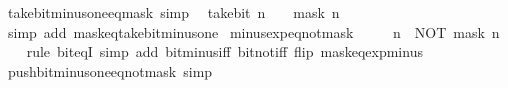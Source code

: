 \begin{isabellebody}
\endisatagproof
{\isafoldproof}%
%
\isadelimproof
\isanewline
%
\endisadelimproof
\isanewline
{}\isamarkupfalse%
\ take{\isacharunderscore}{\kern0pt}bit{\isacharunderscore}{\kern0pt}minus{\isacharunderscore}{\kern0pt}one{\isacharunderscore}{\kern0pt}eq{\isacharunderscore}{\kern0pt}mask\ {\isacharbrackleft}{\kern0pt}simp{\isacharbrackright}{\kern0pt}{\isacharcolon}{\kern0pt}\isanewline
\ \ {\isacartoucheopen}take{\isacharunderscore}{\kern0pt}bit\ n\ {\isacharparenleft}{\kern0pt}{\isacharminus}{\kern0pt}\ {}{\isacharparenright}{\kern0pt}\ {\isacharequal}{\kern0pt}\ mask\ n{\isacartoucheclose}\isanewline
%
\isadelimproof
\ \ %
\endisadelimproof
%
\isatagproof
{}\isamarkupfalse%
\ {\isacharparenleft}{\kern0pt}simp\ add{\isacharcolon}{\kern0pt}\ mask{\isacharunderscore}{\kern0pt}eq{\isacharunderscore}{\kern0pt}take{\isacharunderscore}{\kern0pt}bit{\isacharunderscore}{\kern0pt}minus{\isacharunderscore}{\kern0pt}one{\isacharparenright}{\kern0pt}%
\endisatagproof
{\isafoldproof}%
%
\isadelimproof
\isanewline
%
\endisadelimproof
\isanewline
{}\isamarkupfalse%
\ minus{\isacharunderscore}{\kern0pt}exp{\isacharunderscore}{\kern0pt}eq{\isacharunderscore}{\kern0pt}not{\isacharunderscore}{\kern0pt}mask{\isacharcolon}{\kern0pt}\isanewline
\ \ {\isacartoucheopen}{\isacharminus}{\kern0pt}\ {\isacharparenleft}{\kern0pt}{}\ {\isacharcircum}{\kern0pt}\ n{\isacharparenright}{\kern0pt}\ {\isacharequal}{\kern0pt}\ NOT\ {\isacharparenleft}{\kern0pt}mask\ n{\isacharparenright}{\kern0pt}{\isacartoucheclose}\isanewline
%
\isadelimproof
\ \ %
\endisadelimproof
%
\isatagproof
{}\isamarkupfalse%
\ {\isacharparenleft}{\kern0pt}rule\ bit{\isacharunderscore}{\kern0pt}eqI{\isacharparenright}{\kern0pt}\ {\isacharparenleft}{\kern0pt}simp\ add{\isacharcolon}{\kern0pt}\ bit{\isacharunderscore}{\kern0pt}minus{\isacharunderscore}{\kern0pt}iff\ bit{\isacharunderscore}{\kern0pt}not{\isacharunderscore}{\kern0pt}iff\ flip{\isacharcolon}{\kern0pt}\ mask{\isacharunderscore}{\kern0pt}eq{\isacharunderscore}{\kern0pt}exp{\isacharunderscore}{\kern0pt}minus{\isacharunderscore}{\kern0pt}{}{\isacharparenright}{\kern0pt}%
\endisatagproof
{\isafoldproof}%
%
\isadelimproof
\isanewline
%
\endisadelimproof
\isanewline
{}\isamarkupfalse%
\ push{\isacharunderscore}{\kern0pt}bit{\isacharunderscore}{\kern0pt}minus{\isacharunderscore}{\kern0pt}one{\isacharunderscore}{\kern0pt}eq{\isacharunderscore}{\kern0pt}not{\isacharunderscore}{\kern0pt}mask\ {\isacharbrackleft}{\kern0pt}simp{\isacharbrackright}{\kern0pt}{\isacharcolon}{\kern0pt}\isanewline

\end{isabellebody}
